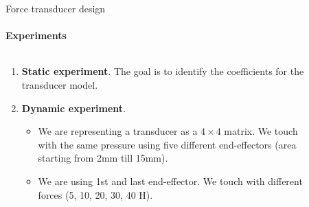 \documentclass[aspectratio=169]{beamer}
\begin{document}
\begin{frame}[t]{Force transducer design}
    \framesubtitle{Experiments}
    \vspace{-15pt}
    \begin{columns}[T,onlytextwidth]
        \begin{column}{0.6\textwidth}
            {\large
                \begin{enumerate}
                    \item \textbf{Static experiment}. The goal is to identify the coefficients for the transducer model.
                    \item\textbf{ Dynamic experiment}. 
                    \begin{itemize}
                        \item We are representing a transducer as a $4\times4$ matrix. We touch with the same pressure using five different end-effectors (area starting from 2mm till 15mm).
                        \item We are using 1st and last end-effector. We touch with different forces (5, 10, 20, 30, 40 H).
                    \end{itemize}
                \end{enumerate}
            }
        \end{column}
        \begin{column}{0.39\textwidth}
            \vspace{-0.5cm}
            \begin{figure}[H]
                \centering
\end{figure}
\end{column}
\end{columns}
\end{frame}
\end{document}
